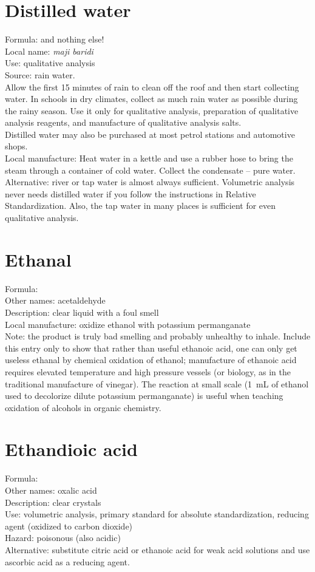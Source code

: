 \section{Distilled water}
Formula:  and nothing else!\\
Local name: \textit{maji baridi}\\
Use: qualitative analysis\\
Source: rain water.\\
Allow the first 15 minutes of rain to clean off the roof 
and then start collecting water. 
In schools in dry climates, 
collect as much rain water as possible during the rainy season. 
Use it only for qualitative analysis, 
preparation of qualitative analysis reagents, 
and manufacture of qualitative analysis salts.\\ 
Distilled water may also be purchased at most petrol stations 
and automotive shops.\\
Local manufacture: Heat water in a kettle 
and use a rubber hose to bring the steam through a container of cold water. 
Collect the condensate -- pure water.\\
Alternative: river or tap water is almost always sufficient. 
Volumetric analysis never needs distilled water 
if you follow the instructions in Relative Standardization. 
Also, 
the tap water in many places is sufficient for even qualitative analysis.

\section{Ethanal}
\label{sec:ethanal}
Formula: \\
Other names: acetaldehyde\\
Description: clear liquid with a foul smell\\
Local manufacture: oxidize ethanol with potassium permanganate\\
Note: the product is truly bad smelling and probably unhealthy to inhale. 
Include this entry only to show that rather than useful ethanoic acid, 
one can only get useless ethanal by chemical oxidation of ethanol; 
manufacture of ethanoic acid requires elevated temperature 
and high pressure vessels (or biology, 
as in the traditional manufacture of vinegar). 
The reaction at small scale 
(1~mL of ethanol used to decolorize dilute potassium permanganate) 
is useful when teaching oxidation of alcohols in organic chemistry.

\section{Ethandioic acid}
Formula: \\
Other names: oxalic acid\\
Description: clear crystals\\
Use: volumetric analysis, 
primary standard for absolute standardization, 
reducing agent (oxidized to carbon dioxide)\\
Hazard: poisonous (also acidic)\\
Alternative: substitute citric acid or ethanoic acid 
for weak acid solutions and use ascorbic acid as a reducing agent.


